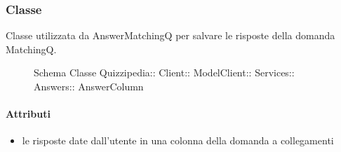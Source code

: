 \subsubsection{Classe }
Classe utilizzata da AnswerMatchingQ per salvare le risposte della domanda MatchingQ.
\begin{figure}[H]
\centering
\noindent{}
\caption[Schema Classe AnswerColumn]{Schema Classe Quizzipedia:: Client:: ModelClient:: Services:: Answers:: AnswerColumn}
\end{figure}
\paragraph{Attributi}
\begin{itemize}
\item {}
\newline
le risposte date dall'utente in una colonna della domanda a collegamenti
\end{itemize}
